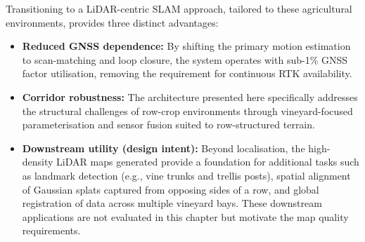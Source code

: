 Transitioning to a LiDAR-centric SLAM approach, tailored to these agricultural environments, provides three distinct advantages:
\begin{itemize}
	\item \textbf{Reduced GNSS dependence:} By shifting the primary motion estimation to scan-matching and loop closure, the system operates with sub-1\% GNSS factor utilisation, removing the requirement for continuous RTK availability.
	\item \textbf{Corridor robustness:} The architecture presented here specifically addresses the structural challenges of row-crop environments through vineyard-focused parameterisation and sensor fusion suited to row-structured terrain.
	\item \textbf{Downstream utility (design intent):} Beyond localisation, the high-density LiDAR maps generated provide a foundation for additional tasks such as landmark detection (e.g., vine trunks and trellis posts), spatial alignment of Gaussian splats captured from opposing sides of a row, and global registration of data across multiple vineyard bays. These downstream applications are not evaluated in this chapter but motivate the map quality requirements.
\end{itemize}
